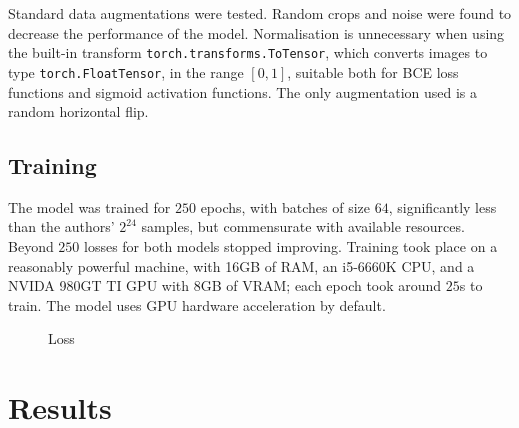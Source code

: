 \documentclass[11pt]{article} %
\begin{document}
Standard data augmentations were tested.  Random crops and noise were found to decrease the performance of the model. Normalisation is unnecessary when using the built-in transform \verb|torch.transforms.ToTensor|, which converts images to type \verb|torch.FloatTensor|, in the range $[0, 1]$, suitable both for BCE loss functions and sigmoid activation functions. The only augmentation used is a random horizontal flip. 

\subsection{Training}

The model was trained for $250$ epochs, with batches of size $64$, significantly less than the authors' $2^{24}$ samples, but commensurate with available resources. Beyond $250$ losses for both models stopped improving. Training took place on a reasonably powerful machine, with 16GB of RAM, an i5-6660K CPU, and a NVIDA 980GT TI GPU with 8GB of VRAM; each epoch took around $25$s to train. The model uses GPU hardware acceleration by default. 

\begin{figure}[h!]
    \centering
    \qquad
    \caption{Loss}
\end{figure}

\clearpage
\section{Results}
\end{document}

